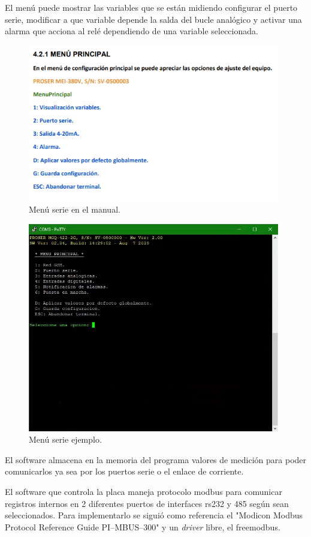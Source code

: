 El menú puede mostrar las variables que se están midiendo configurar el puerto serie, modificar a que variable depende la salda del bucle analógico y activar una alarma que acciona al relé dependiendo de una variable seleccionada.

\begin{figure}[!htb]
	\centering
	\includegraphics[width=110mm,keepaspectratio]{Figures/menumanual.png}
	\caption{Menú serie en el manual.}
	\label{fig:menumanual}
\end{figure}

\begin{figure}[!htb]
	\centering
	\includegraphics[width=110mm,keepaspectratio]{Figures/menudispositivo07.png}
	\caption{Menú serie ejemplo.}
	\label{fig:serialmenu}
\end{figure}

El software almacena en la memoria del programa valores de medición para poder comunicarlos ya sea por los puertos serie o el enlace de corriente.

El software que controla la placa maneja protocolo modbus para comunicar registros internos en 2 diferentes puertos de interfaces rs232 y 485 según sean seleccionados. Para implementarlo se siguió como referencia el "Modicon Modbus Protocol Reference Guide PI–MBUS–300" y un \textit{driver} libre, el freemodbus.

